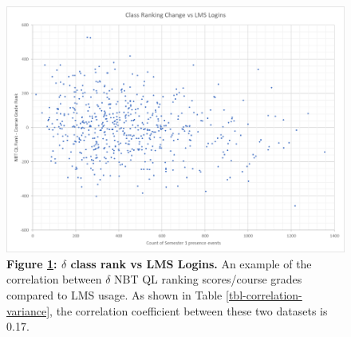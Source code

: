 \begin{figure}[H]
    \centering
    \includegraphics[scale=0.6]{./resources/figures/delta-class-rank.png}
    \caption[\( \delta \) class rank vs LMS Logins]{\textbf{Figure \ref{fig-delta-rank}: \( \delta \) class rank vs LMS Logins.} An example of the correlation between \( \delta \) NBT QL ranking scores/course grades compared to LMS usage. As shown in Table \ref{tbl-correlation-variance}, the correlation coefficient between these two datasets is 0.17.}
    \label{fig-delta-rank}
\end{figure}